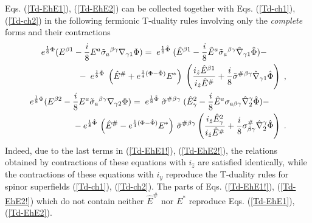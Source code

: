 \documentclass[a4paper,11pt]{article}
\begin{document}
Eqs. (\ref{Td-EhE1}), (\ref{Td-EhE2})  
can be collected together with 
Eqs. (\ref{Td-ch1}), (\ref{Td-ch2}) in the following 
fermionic T-duality rules involving only the {\sl complete} forms 
and their contractions
\begin{eqnarray}\label{Td-EhE1!}
e^{{1\over 8}{\Phi}} 
({E}^{ {\beta}1} - {i \over 8} 
{E}^{ {a}} 
\tilde{\sigma}_{ {a}}{}^{ {\beta} {\gamma}}
{\nabla}_{ {\gamma}1}{\Phi}) 
= \;  e^{{1\over 8}\hat{\Phi}}\; 
(\hat{E}^{ {\beta}1} - {i \over 8} 
\hat{E}^{ {a}}
\tilde{\sigma}_{ {a}}{}^{ {\beta} {\gamma}}
\hat{\nabla}_{ {\gamma}1}\hat{\Phi}) - 
\;  \qquad \nonumber \\  
{} \qquad - 
 \;  e^{{1\over 8}\hat{\Phi}}\; 
\left(\hat{E}^{ {\#}} + 
e^{{1\over 4}(\Phi -\hat{\Phi})}
{E}^{ {*}}\right) \; \left(
{i_{\hat{z}}
\hat{E}^{ {\beta}1}\over i_{\hat{z}}\hat{E}^{ {\#}}}
+  {i \over 8} 
\tilde{\sigma}^{ {\#}}{}^{ {\beta} {\gamma}}
\hat{\nabla}_{ {\gamma}1}\hat{\Phi}\right) \; , 
\\ 
\label{Td-EhE2!} 
e^{{1\over 8}{\Phi}} 
({E}^{ {\beta}2} - {i \over 8} 
{E}^{ {a}} 
\tilde{\sigma}_{ {a}}{}^{ {\beta} {\gamma}}
{\nabla}_{ {\gamma}2}{\Phi}) 
= \; 
e^{{1\over 8}\hat{\Phi}}\;  
\tilde{\sigma}^{ {\#} {\beta} {\gamma}}
\; ( \hat{E}_{ {\gamma}}^2  - {i \over 8}  
\hat{E}^{ {a}}
{\sigma}_{{ {a}} {\beta} {\gamma}}
\hat{\nabla}^{ {\gamma}}_2\hat{\Phi}) - 
 \qquad \nonumber \\  
{} \qquad -   e^{{1\over 8}\hat{\Phi}}\,  
\left(\hat{E}^{ {\#}} - 
e^{{1\over 4}(\Phi -\hat{\Phi})}
{E}^{ {*}}\right) \, 
\tilde{\sigma}^{ {\#} {\beta} {\gamma}}
\left({i_{\hat{z}}\hat{E}_{ {\gamma}}^2
\over i_{\hat{z}}\hat{E}^{ {\#}}}  + {i \over 8}  
{\sigma}^{\#}_{ {\beta} {\gamma}}
\hat{\nabla}^{ {\gamma}}_2\hat{\Phi}\right) \; . 
\end{eqnarray}
Indeed, due to the last terms in (\ref{Td-EhE1!}), (\ref{Td-EhE2!}), 
the relations obtained by 
contractions of these equations with $i_{\hat{z}}$ are 
satisfied identically, while the contractions 
of these equations with $i_{y}$ reproduce the T-duality rules 
for spinor superfields  (\ref{Td-ch1}), (\ref{Td-ch2}). 
The parts of Eqs. (\ref{Td-EhE1!}), (\ref{Td-EhE2!}) which do not 
contain neither $\hat{E}^{ {\#}}$ nor ${E}^{ {*}}$
reproduce Eqs. (\ref{Td-EhE1}), (\ref{Td-EhE2}).
\end{document}
